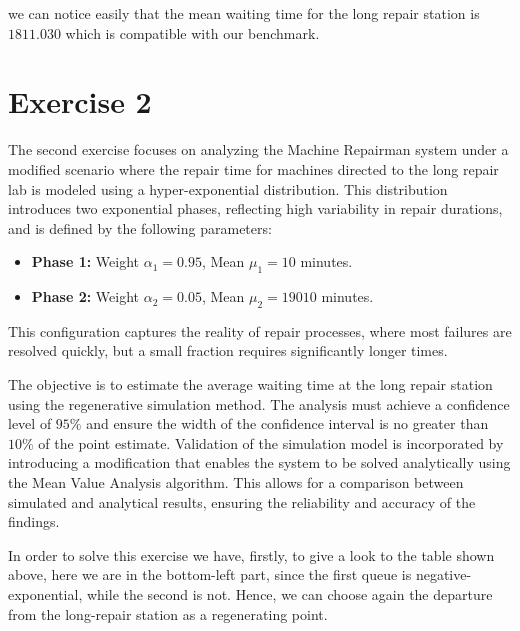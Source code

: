 \documentclass[12pt]{article}
\begin{document}
	
	we can notice easily that the mean waiting time for the long repair station is $1811.030$ which is compatible with our benchmark. 
	
	\section{Exercise 2}
	The second exercise focuses on analyzing the Machine Repairman system under a modified scenario where the repair time for machines directed to the long repair lab is modeled using a hyper-exponential distribution. This distribution introduces two exponential phases, reflecting high variability in repair durations, and is defined by the following parameters:
	
	\begin{itemize}
		\item \textbf{Phase 1:} Weight $\alpha_1 = 0.95$, Mean $\mu_1 = 10$ minutes.
		\item \textbf{Phase 2:} Weight $\alpha_2 = 0.05$, Mean $\mu_2 = 19010$ minutes.
	\end{itemize}
	
	This configuration captures the reality of repair processes, where most failures are resolved quickly, but a small fraction requires significantly longer times.
	
	The objective is to estimate the average waiting time at the long repair station using the regenerative simulation method. The analysis must achieve a confidence level of $95\%$ and ensure the width of the confidence interval is no greater than $10\%$ of the point estimate. Validation of the simulation model is incorporated by introducing a modification that enables the system to be solved analytically using the Mean Value Analysis algorithm. This allows for a comparison between simulated and analytical results, ensuring the reliability and accuracy of the findings.
	
	In order to solve this exercise we have, firstly, to give a look to the table shown above, here we are in the bottom-left part, since the first queue is negative-exponential, while the second is not. Hence, we can choose again the departure from the long-repair station as a regenerating point.
	
	
\end{document}
